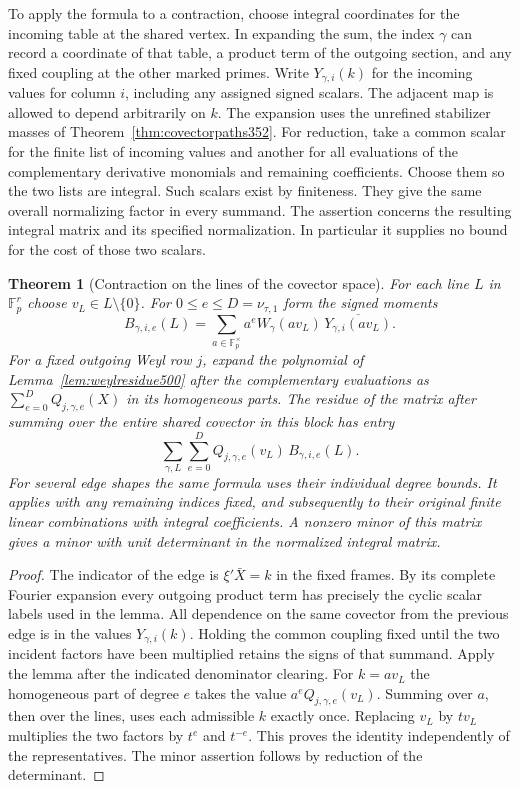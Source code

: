 \documentclass[a4paper,11pt]{article}
\newtheorem{theorem}[proposition]{Theorem}
\theoremstyle{definition}
\theoremstyle{remark}
\numberwithin{equation}{section}
\begin{document}
To apply the formula to a contraction, choose integral
coordinates for the incoming table at the shared vertex.
In expanding the sum, the index \(\gamma\) can record a
coordinate of that table, a product term of the outgoing
section, and any fixed coupling at the other marked primes.
Write \(Y_{\gamma,i}(k)\) for the incoming values for column
\(i\), including any assigned signed scalars. The adjacent map
is allowed to depend arbitrarily on \(k\).
The expansion uses the unrefined stabilizer masses of
Theorem~\ref{thm:covectorpaths352}. For reduction, take a common
scalar for the finite list of incoming values and another for
all evaluations of the complementary derivative monomials and
remaining coefficients. Choose them so the two lists are
integral. Such scalars exist by finiteness. They give the same
overall normalizing factor in every summand. The assertion
concerns the resulting integral matrix and its specified
normalization. In particular it supplies no bound for the cost
of those two scalars.

\begin{theorem}[Contraction on the lines of the covector space]\leavevmode
\label{thm:weylmoments500}
For each line \(L\) in \(\mathbb F_p^r\) choose \(v_L\in
L\setminus\{0\}\). For \(0\le e\le D=\nu_{\tau,1}\) form the
signed moments
\[
 B_{\gamma,i,e}(L)=
     \sum_{a\in\mathbb F_p^\times}
              a^e W_\gamma(av_L)\,\overline{Y_{\gamma,i}(av_L)}.
\]
For a fixed outgoing Weyl row \(j\), expand the polynomial of
Lemma~\ref{lem:weylresidue500} after the complementary
evaluations as \(\sum_{e=0}^{D}Q_{j,\gamma,e}(X)\) in its
homogeneous parts. The residue of the matrix after summing over
the entire shared covector in this block has entry
\[
             \sum_{\gamma,L}\sum_{e=0}^{D}
                  Q_{j,\gamma,e}(v_L)\, B_{\gamma,i,e}(L).
\]
For several edge shapes the same formula uses their individual
degree bounds. It applies with any remaining indices fixed, and
subsequently to their original finite linear combinations with
integral coefficients. A nonzero minor of this matrix gives a
minor with unit determinant in the normalized integral matrix.
\end{theorem}
\begin{proof}
The indicator of the edge is \(\xi'\bar X=k\) in the fixed
frames. By its complete Fourier expansion every outgoing
product term has precisely the cyclic scalar labels used in the
lemma. All dependence on the same covector from the previous
edge is in the values \(Y_{\gamma,i}(k)\). Holding the common
coupling fixed until the two incident factors have been
multiplied retains the signs of that summand. Apply the lemma
after the indicated denominator clearing. For \(k=a v_L\) the
homogeneous part of degree \(e\) takes the value
\(a^e Q_{j,\gamma,e}(v_L)\). Summing over \(a\), then over
the lines, uses each admissible \(k\) exactly once. Replacing
\(v_L\) by \(t v_L\) multiplies the two factors by \(t^e\)
and \(t^{-e}\). This proves the identity independently of the
representatives. The minor assertion follows by reduction of
the determinant.
\end{proof}
\end{document}
